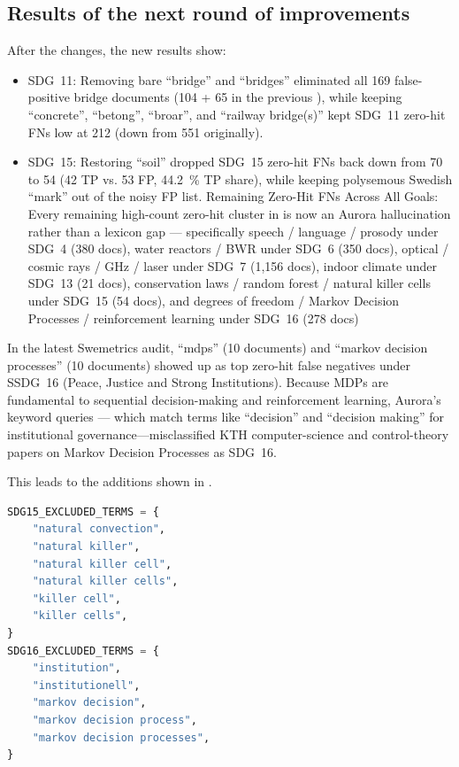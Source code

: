 \subsection{Results of the next round of improvements}
After the changes, the new results show:
\begin{itemize}
    \item \gls{SDG}~11: Removing bare \enquote{bridge} and \enquote{bridges} eliminated all 169 false-positive bridge documents (104 + 65 in the previous ), while keeping \enquote{concrete}, \enquote{betong}, \enquote{broar}, and \enquote{railway bridge(s)} kept \gls{SDG}~11 zero-hit FNs low at 212 (down from 551 originally).
    
    \item \gls{SDG}~15: Restoring \enquote{soil} dropped \gls{SDG}~15 zero-hit FNs back down from 70 to 54 (42 TP vs. 53 FP, \qty{44.2}{\percent} TP share), while keeping polysemous Swedish \enquote{mark} out of the noisy FP list.   Remaining Zero-Hit FNs Across All Goals: Every remaining high-count zero-hit cluster in  is now an Aurora hallucination rather than a lexicon gap --- specifically speech / language / prosody under \gls{SDG}~4 (380 docs), water reactors / BWR under \gls{SDG}~6 (350 docs), optical / cosmic rays / GHz / laser under \gls{SDG}~7 (1,156 docs), indoor climate under \gls{SDG}~13 (21 docs), conservation laws / random forest / natural killer cells under \gls{SDG}~15 (54 docs), and degrees of freedom / Markov Decision Processes / reinforcement learning under \gls{SDG}~16 (278 docs)
\end{itemize}

In the latest Swemetrics audit, \enquote{mdps} (10 documents) and \enquote{markov decision processes} (10 documents) showed up as top zero-hit false negatives under S\gls{SDG}~16 (Peace, Justice and Strong Institutions). Because MDPs are fundamental to sequential decision-making and reinforcement learning, Aurora's keyword queries --- which match terms like \enquote{decision} and \enquote{decision making} for institutional governance—misclassified \gls{KTH} computer-science and control-theory papers on Markov Decision Processes as \gls{SDG}~16.

This leads to the additions shown in .
\begin{lstlisting}[language=Python, basicstyle=\footnotesize, escapechar=|, breaklines=true,
    postbreak=\usebox{\lstbreakbox}, caption={Python code for keeping natural killer cells out of \gls{SDG}~15 and Markov Decision Process and related out of \gls{SDG}~16}, label=lst:ExcludeMDPFromSDGa]
SDG15_EXCLUDED_TERMS = {
    "natural convection",
    "natural killer",
    "natural killer cell",
    "natural killer cells",
    "killer cell",
    "killer cells",
}
SDG16_EXCLUDED_TERMS = {
    "institution",
    "institutionell",
    "markov decision",
    "markov decision process",
    "markov decision processes",
}
\end{lstlisting}

